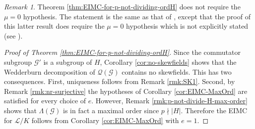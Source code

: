 \documentclass[12pt]{amsart}
\theoremstyle{plain}
\theoremstyle{remark}
\newtheorem{remark}[theorem]{Remark}
\theoremstyle{definition}
\numberwithin{equation}{section}
\begin{document}
\begin{remark}
Theorem \ref{thm:EIMC-for-p-not-dividing-ordH} does not require the $\mu=0$ hypothesis.
The statement is the same as that of \cite[Example 2]{MR2205173},
except that the proof of this latter result does require the $\mu=0$ hypothesis which is not explicitly stated (see \cite[p.\ 48]{MR2242618}).
\end{remark}

\begin{proof}[Proof of Theorem \ref{thm:EIMC-for-p-not-dividing-ordH}]
Since the commutator subgroup $\mathcal{G}'$ is a subgroup of $H$,
Corollary \ref{cor:no-skewfields} shows that the Wedderburn decomposition of $\mathcal{Q}(\mathcal{G})$ contains no skewfields.
This has two consequences. First, uniqueness follows from Remark \ref{rmk:SK1}.
Second, by Remark \ref{rmk:nr-surjective} the hypotheses of Corollary \ref{cor:EIMC-MaxOrd} are satisfied for every choice of $e$.
However, Remark \ref{rmk:p-not-divide-H-max-order} shows that $\Lambda(\mathcal{G})$ is in fact a maximal order since $p \nmid |H|$.
Therefore the EIMC for $\mathcal{L}/K$ follows from Corollary \ref{cor:EIMC-MaxOrd} with $e=1$.
\end{proof}
\end{document}
